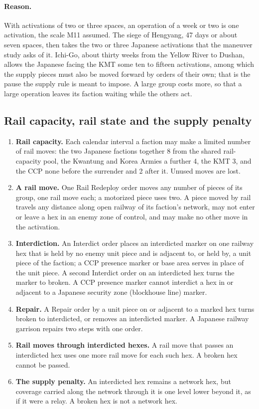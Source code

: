 \documentclass[11pt]{article}
\begin{document}
\paragraph{Reason.} With activations of two or three spaces, an operation of a week or two is one activation, the scale M11 assumed. The siege of Hengyang, 47 days or about seven spaces, then takes the two or three Japanese activations that the maneuver study asks of it. Ichi-Go, about thirty weeks from the Yellow River to Dushan, allows the Japanese facing the KMT some ten to fifteen activations, among which the supply pieces must also be moved forward by orders of their own; that is the pause the supply rule is meant to impose. A large group costs more, so that a large operation leaves its faction waiting while the others act.

\subsection{Rail capacity, rail state and the supply penalty}\label{app:rail}
\draft
\begin{enumerate}
\item \textbf{Rail capacity.} Each calendar interval a faction may make a limited number of rail moves: the two Japanese factions together 8 from the shared rail-capacity pool, the Kwantung and Korea Armies a further 4, the KMT 3, and the CCP none before the surrender and 2 after it. Unused moves are lost.
\item \textbf{A rail move.} One Rail Redeploy order moves any number of pieces of its group, one rail move each; a motorized piece uses two. A piece moved by rail travels any distance along open railway of its faction's network, may not enter or leave a hex in an enemy zone of control, and may make no other move in the activation.
\item \textbf{Interdiction.} An Interdict order places an interdicted marker on one railway hex that is held by no enemy unit piece and is adjacent to, or held by, a unit piece of the faction; a CCP presence marker or base area serves in place of the unit piece. A second Interdict order on an interdicted hex turns the marker to broken. A CCP presence marker cannot interdict a hex in or adjacent to a Japanese security zone (blockhouse line) marker.
\item \textbf{Repair.} A Repair order by a unit piece on or adjacent to a marked hex turns broken to interdicted, or removes an interdicted marker. A Japanese railway garrison repairs two steps with one order.
\item \textbf{Rail moves through interdicted hexes.} A rail move that passes an interdicted hex uses one more rail move for each such hex. A broken hex cannot be passed.
\item \textbf{The supply penalty.} An interdicted hex remains a network hex, but coverage carried along the network through it is one level lower beyond it, as if it were a relay. A broken hex is not a network hex.
\end{enumerate}
\end{document}
